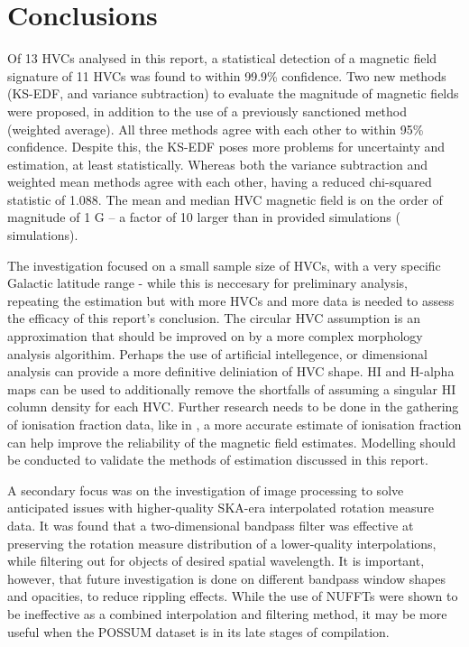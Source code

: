 \chapter{Conclusions}
\label{cha:conclusion}

Of 13 HVCs analysed in this report, a statistical detection of a magnetic field signature of 11 HVCs was found to within 99.9\% confidence. Two new methods (KS-EDF, and variance subtraction) to evaluate the magnitude of magnetic fields were proposed, in addition to the use of a previously sanctioned method (weighted average). All three methods agree with each other to within 95\% confidence. Despite this, the KS-EDF poses more problems for uncertainty and estimation, at least statistically. Whereas both the variance subtraction and weighted mean methods agree with each other, having a reduced chi-squared statistic of 1.088. The mean and median HVC magnetic field is on the order of magnitude of 1 \textmu G – a factor of 10 larger than in provided simulations (\citeauthor{ID23} simulations).


The investigation focused on a small sample size of HVCs, with a very specific Galactic latitude range - while this is neccesary for preliminary analysis, repeating the estimation but with more HVCs and more data is needed to assess the efficacy of this report's conclusion. The circular HVC assumption is an approximation that should be improved on by a more complex morphology analysis algorithim. Perhaps the use of artificial intellegence, or dimensional analysis can provide a more definitive deliniation of HVC shape. HI and H-alpha maps can be used to additionally remove the shortfalls of assuming a singular HI column density for each HVC. Further research needs to be done in the gathering of ionisation fraction data, like in \cite{ID67}, a more accurate estimate of ionisation fraction can help improve the reliability of the magnetic field estimates. Modelling should be conducted to validate the methods of estimation discussed in this report.


A secondary focus was on the investigation of image processing to solve anticipated issues with higher-quality SKA-era interpolated rotation measure data. It was found that a two-dimensional bandpass filter was effective at preserving the rotation measure distribution of a lower-quality interpolations, while filtering out for objects of desired spatial wavelength. It is important, however, that future investigation is done on different bandpass window shapes and opacities, to reduce rippling effects. While the use of NUFFTs were shown to be ineffective as a combined interpolation and filtering method, it may be more useful when the POSSUM dataset is in its late stages of compilation.
